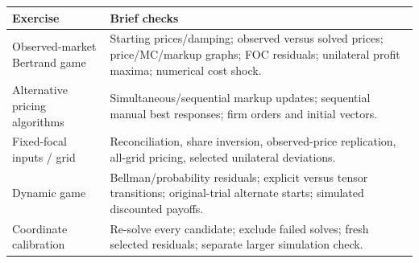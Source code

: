 \documentclass[11pt,]{article}
\begin{document}
\begin{longtable}[]{@{}ll@{}}
\toprule
\begin{minipage}[b]{0.32\columnwidth}\raggedright\strut
Exercise\strut
\end{minipage} & \begin{minipage}[b]{0.62\columnwidth}\raggedright\strut
Brief checks\strut
\end{minipage}\tabularnewline
\midrule
\endhead
\begin{minipage}[t]{0.32\columnwidth}\raggedright\strut
Observed-market Bertrand game\strut
\end{minipage} & \begin{minipage}[t]{0.62\columnwidth}\raggedright\strut
Starting prices/damping; observed versus solved prices; price/MC/markup
graphs; FOC residuals; unilateral profit maxima; numerical cost
shock.\strut
\end{minipage}\tabularnewline
\begin{minipage}[t]{0.32\columnwidth}\raggedright\strut
Alternative pricing algorithms\strut
\end{minipage} & \begin{minipage}[t]{0.62\columnwidth}\raggedright\strut
Simultaneous/sequential markup updates; sequential manual best
responses; firm orders and initial vectors.\strut
\end{minipage}\tabularnewline
\begin{minipage}[t]{0.32\columnwidth}\raggedright\strut
Fixed-focal inputs / grid\strut
\end{minipage} & \begin{minipage}[t]{0.62\columnwidth}\raggedright\strut
Reconciliation, share inversion, observed-price replication, all-grid
pricing, selected unilateral deviations.\strut
\end{minipage}\tabularnewline
\begin{minipage}[t]{0.32\columnwidth}\raggedright\strut
Dynamic game\strut
\end{minipage} & \begin{minipage}[t]{0.62\columnwidth}\raggedright\strut
Bellman/probability residuals; explicit versus tensor transitions;
original-trial alternate starts; simulated discounted payoffs.\strut
\end{minipage}\tabularnewline
\begin{minipage}[t]{0.32\columnwidth}\raggedright\strut
Coordinate calibration\strut
\end{minipage} & \begin{minipage}[t]{0.62\columnwidth}\raggedright\strut
Re-solve every candidate; exclude failed solves; fresh selected
residuals; separate larger simulation check.\strut
\end{minipage}\tabularnewline
\bottomrule
\end{longtable}
\end{document}
